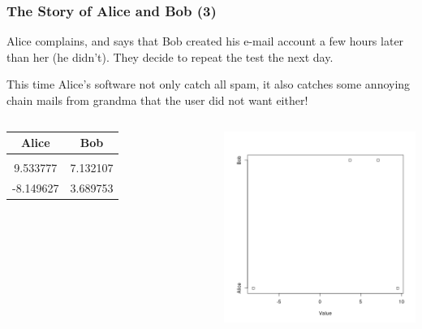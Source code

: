 \documentclass[10pt]{beamer}
\begin{document}
\begin{frame}
  \frametitle{The Story of Alice and Bob (3)}
  \begin{block}{}
    Alice complains, and says that Bob created his e-mail account a
    few hours later than her (he didn't). They decide to repeat the
    test the next day.

    \medskip

    This time Alice's software not only catch all spam, it also
    catches some annoying chain mails from grandma that the user did
    not want either!
  \end{block}
  \begin{columns}[c]
    \begin{tabular}{c|c}
      Alice & Bob \\
      \hline\\
      9.533777 & 7.132107\\
      -8.149627 & 3.689753\\
    \end{tabular}
    \includegraphics[width=1\textwidth]{img/AliceBob_2}
  \end{columns}
\end{frame}
\end{document}
